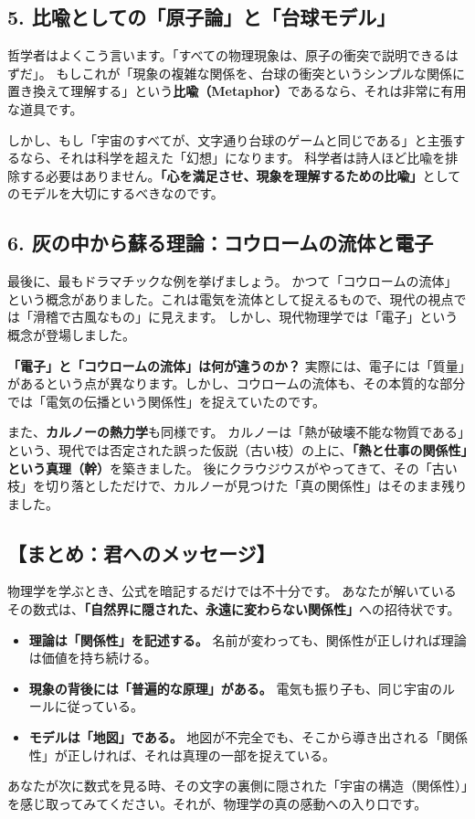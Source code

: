 \documentclass[a4paper,11pt,openany]{ltjsbook}
\begin{document}
\begin{lecturebox}
\subsection*{5. 比喩としての「原子論」と「台球モデル」}

哲学者はよくこう言います。「すべての物理現象は、原子の衝突で説明できるはずだ」。
もしこれが「現象の複雑な関係を、台球の衝突というシンプルな関係に置き換えて理解する」という\textbf{比喩（Metaphor）}であるなら、それは非常に有用な道具です。

しかし、もし「宇宙のすべてが、文字通り台球のゲームと同じである」と主張するなら、それは科学を超えた「幻想」になります。
科学者は詩人ほど比喩を排除する必要はありません。\textbf{「心を満足させ、現象を理解するための比喩」}としてのモデルを大切にするべきなのです。

\subsection*{6. 灰の中から蘇る理論：コウロームの流体と電子}

最後に、最もドラマチックな例を挙げましょう。
かつて「コウロームの流体」という概念がありました。これは電気を流体として捉えるもので、現代の視点では「滑稽で古風なもの」に見えます。
しかし、現代物理学では「電子」という概念が登場しました。

\textbf{「電子」と「コウロームの流体」は何が違うのか？}
実際には、電子には「質量」があるという点が異なります。しかし、コウロームの流体も、その本質的な部分では「電気の伝播という関係性」を捉えていたのです。

また、\textbf{カルノーの熱力学}も同様です。
カルノーは「熱が破壊不能な物質である」という、現代では否定された誤った仮説（古い枝）の上に、\textbf{「熱と仕事の関係性」という真理（幹）}を築きました。
後にクラウジウスがやってきて、その「古い枝」を切り落としただけで、カルノーが見つけた「真の関係性」はそのまま残りました。

\subsection*{【まとめ：君へのメッセージ】}

物理学を学ぶとき、公式を暗記するだけでは不十分です。
あなたが解いているその数式は、\textbf{「自然界に隠された、永遠に変わらない関係性」}への招待状です。

\begin{itemize}[leftmargin=2em]
\item \textbf{理論は「関係性」を記述する。} 名前が変わっても、関係性が正しければ理論は価値を持ち続ける。
\item \textbf{現象の背後には「普遍的な原理」がある。} 電気も振り子も、同じ宇宙のルールに従っている。
\item \textbf{モデルは「地図」である。} 地図が不完全でも、そこから導き出される「関係性」が正しければ、それは真理の一部を捉えている。
\end{itemize}

あなたが次に数式を見る時、その文字の裏側に隠された「宇宙の構造（関係性）」を感じ取ってみてください。それが、物理学の真の感動への入り口です。
\end{lecturebox}
\end{document}

